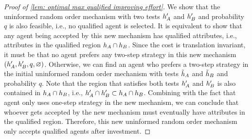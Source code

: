 \begin{proof}[Proof of \cref{lem: optimal max qualified improving effort}]
    We show that the uninformed random order mechanism with two tests $h_A'$ and $h_B'$ and probability $q$ is also feasible, i.e., no qualified agent is selected.
    It is equivalent to show that any agent being accepted by this new mechanism has qualified attributes, i.e., attributes in the qualified region $h_A \cap h_B$.
    Since the cost is translation invariant, it must be that no agent prefers any two-step strategy in this new mechanism $(h_A',h_B',q,\varnothing)$. Otherwise, we can find an agent who prefers a two-step strategy in the initial uninformed random order mechanism with tests $\tilde{h}_A$ and $\tilde {h}_B$ and probability $q$.
    Note that the region that satisfies both tests $h_A'$ and $h_B'$ is also contained in $h_A \cap h_B$, i.e., $h_A' \cap h_B'\subset h_A \cap h_B$. 
    Combining with the fact that agent only uses one-step strategy in the new mechanism, we can conclude that whoever gets accepted by the new mechanism must eventually have attributes in the qualified region.
    Therefore, this new uninformed random order mechanism only accepts qualified agents after investment. 
    

\end{proof}
